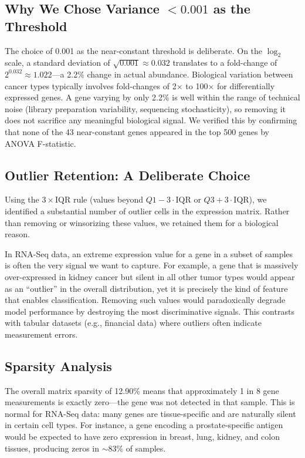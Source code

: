 \documentclass{article}
\begin{document}
\subsection{Why We Chose Variance $< 0.001$ as the Threshold}
The choice of 0.001 as the near-constant threshold is deliberate. On the $\log_2$ scale, a standard deviation of $\sqrt{0.001} \approx 0.032$ translates to a fold-change of $2^{0.032} \approx 1.022$---a 2.2\% change in actual abundance. Biological variation between cancer types typically involves fold-changes of 2$\times$ to 100$\times$ for differentially expressed genes. A gene varying by only 2.2\% is well within the range of technical noise (library preparation variability, sequencing stochasticity), so removing it does not sacrifice any meaningful biological signal. We verified this by confirming that none of the 43 near-constant genes appeared in the top 500 genes by ANOVA F-statistic.

\subsection{Outlier Retention: A Deliberate Choice}
Using the $3\times\text{IQR}$ rule (values beyond $Q1 - 3\cdot\text{IQR}$ or $Q3 + 3\cdot\text{IQR}$), we identified a substantial number of outlier cells in the expression matrix. Rather than removing or winsorizing these values, we retained them for a biological reason.

In RNA-Seq data, an extreme expression value for a gene in a subset of samples is often the very signal we want to capture. For example, a gene that is massively over-expressed in kidney cancer but silent in all other tumor types would appear as an ``outlier'' in the overall distribution, yet it is precisely the kind of feature that enables classification. Removing such values would paradoxically degrade model performance by destroying the most discriminative signals. This contrasts with tabular datasets (e.g., financial data) where outliers often indicate measurement errors.

\subsection{Sparsity Analysis}
The overall matrix sparsity of 12.90\% means that approximately 1 in 8 gene measurements is exactly zero---the gene was not detected in that sample. This is normal for RNA-Seq data: many genes are tissue-specific and are naturally silent in certain cell types. For instance, a gene encoding a prostate-specific antigen would be expected to have zero expression in breast, lung, kidney, and colon tissues, producing zeros in $\sim$83\% of samples.
\end{document}
